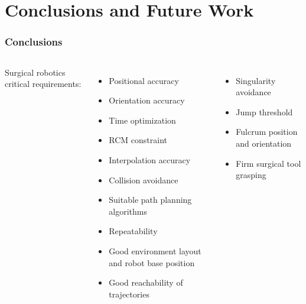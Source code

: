 \section{Conclusions and Future Work}

\begin{frame}
\frametitle{Conclusions}
\begin{columns}[t]
Surgical robotics critical requirements:
\begin{itemize}
\item Positional accuracy
\item Orientation accuracy
\item Time optimization
\item RCM constraint
\item Interpolation accuracy
\item Collision avoidance
\item Suitable path planning algorithms
\item Repeatability
\item Good environment layout and robot base position
\item Good reachability of trajectories
\end{itemize}

\begin{itemize}
\item Singularity avoidance
\item Jump threshold
\item Fulcrum position and orientation
\item Firm surgical tool grasping
\end{itemize}
\vfill
\end{columns}
\end{frame}

